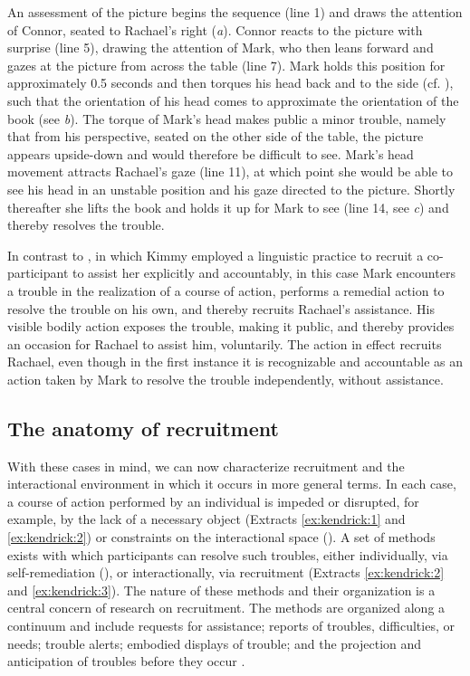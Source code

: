 \documentclass[output=paper,nonflat,modfont,draft]{langsci/langscibook}
\begin{document}
An assessment of the picture begins the sequence (line 1) and draws the attention of Connor, seated to Rachael’s right (\textit{a}). Connor reacts to the picture with surprise (line 5), drawing the attention of Mark, who then leans forward and gazes at the picture from across the table (line 7). Mark holds this position for approximately 0.5 seconds and then torques his head back and to the side (cf. \citealt{Schegloff1998}), such that the orientation of his head comes to approximate the orientation of the book (see \textit{b}). The torque of Mark’s head makes public a minor trouble, namely that from his perspective, seated on the other side of the table, the picture appears upside-down and would therefore be difficult to see. Mark’s head movement attracts Rachael’s gaze (line 11), at which point she would be able to see his head in an unstable position and his gaze directed to the picture. Shortly thereafter she lifts the book and holds it up for Mark to see (line 14, see \textit{c}) and thereby resolves the trouble.

In contrast to , in which Kimmy employed a linguistic practice to recruit a co-participant to assist her explicitly and accountably, in this case Mark encounters a trouble in the realization of a course of action, performs a remedial action to resolve the trouble on his own, and thereby recruits Rachael’s assistance. His visible bodily action exposes the trouble, making it public, and thereby provides an occasion for Rachael to assist him, voluntarily. The action in effect recruits Rachael, even though in the first instance it is recognizable and accountable as an action taken by Mark to resolve the trouble independently, without assistance.

\subsection{The anatomy of recruitment}
With these cases in mind, we can now characterize recruitment and the interactional environment in which it occurs in more general terms. In each case, a course of action performed by an individual is impeded or disrupted, for example, by the lack of a necessary object (Extracts \ref{ex:kendrick:1} and \ref{ex:kendrick:2}) or constraints on the interactional space (). A set of methods exists with which participants can resolve such troubles, either individually, via self-remediation (), or interactionally, via recruitment (Extracts \ref{ex:kendrick:2} and \ref{ex:kendrick:3}). The nature of these methods and their organization is a central concern of research on recruitment. The methods are organized along a continuum and include requests for assistance; reports of troubles, difficulties, or needs; trouble alerts; embodied displays of trouble; and the projection and anticipation of troubles before they occur \citep{KendrickDrew2016}.
\end{document}

